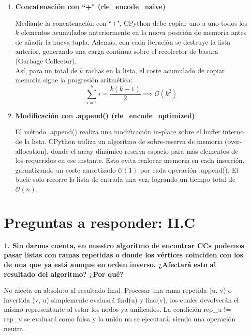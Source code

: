 \documentclass{article}
\begin{document}
\begin{enumerate}

    \vspace{0.5cm}
    \item \textbf{Concatenación con ``+" (rle\_encode\_naive)}

    Mediante la concatenación con ``+", CPython debe copiar uno a uno todos los $k$ elementos acumulados anteriormente en la nueva posición de memoria antes de añadir la nueva tupla. Además, con cada iteración se destruye la lista anterior, generando una carga continua sobre el recolector de basura (Garbage Collector).\\
    Así, para un total de $k$ rachas en la lista, el coste acumulado de copiar memoria sigue la progresión aritmética:$$\sum_{i=1}^{k} i = \frac{k(k+1)}{2} \implies \mathcal{O}(k^2)$$

    \newpage %
    \item \textbf{Modificación con .append() (rle\_encode\_optimized)}

    El método .append() realiza una modificación in-place sobre el buffer interno de la lista. CPython utiliza un algoritmo de sobre-reserva de memoria (over-allocation), donde el array dinámico reserva espacio para más elementos de los requeridos en ese instante. Esto evita realocar memoria en cada inserción, garantizando un coste amortizado $\mathcal{O}(1)$ por cada operación .append(). El bucle solo recorre la lista de entrada una vez, logrando un tiempo total de $\mathcal{O}(n)$.
    
\end{enumerate}

\vspace{0.5cm}

\section{Preguntas a responder: II.C}

    \item \textbf{1. Sin darnos cuenta, en nuestro algoritmo de encontrar CCs podemos pasar listas con ramas repetidas o donde los vértices coinciden con los de una que ya está aunque en orden inverso. ¿Afectará esto al resultado del algoritmo? ¿Por qué?}

    \vspace{0.3cm}

\begin{enumerate}

    No afecta en absoluto al resultado final. Procesar una rama repetida (u, v) o invertida (v, u) simplemente evaluará find(u) y find(v), los cuales devolverán el mismo representante al estar los nodos ya unificados. La condición rep\_u != rep\_v se evaluará como falsa y la unión no se ejecutará, siendo una operación neutra.
    
\end{enumerate}
\end{document}
